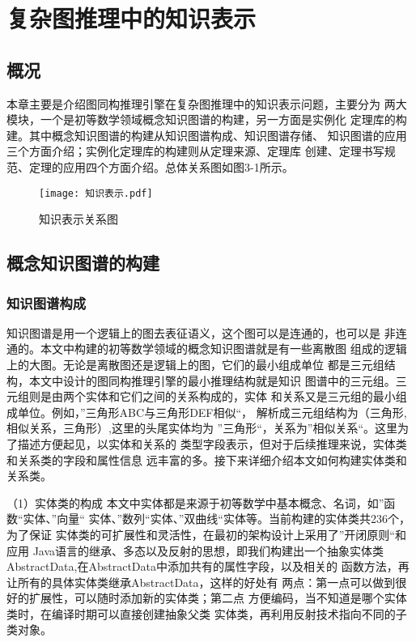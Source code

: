 \documentclass{standalone}
\begin{document}
\chapter{复杂图推理中的知识表示}
\section{概况}
本章主要是介绍图同构推理引擎在复杂图推理中的知识表示问题，主要分为
两大模块，一个是初等数学领域概念知识图谱的构建，另一方面是实例化
定理库的构建。其中概念知识图谱的构建从知识图谱构成、知识图谱存储、
知识图谱的应用三个方面介绍；实例化定理库的构建则从定理来源、定理库
创建、定理书写规范、定理的应用四个方面介绍。总体关系图如图3-1所示。

\begin{figure}[htbp]
	\texttt{[image: 知识表示.pdf]}
	\caption{知识表示关系图}
	\label{知识表示}
\end{figure}
\section{概念知识图谱的构建}
\subsection{知识图谱构成}
知识图谱是用一个逻辑上的图去表征语义，这个图可以是连通的，也可以是
非连通的。本文中构建的初等数学领域的概念知识图谱就是有一些离散图
组成的逻辑上的大图。无论是离散图还是逻辑上的图，它们的最小组成单位
都是三元组结构，本文中设计的图同构推理引擎的最小推理结构就是知识
图谱中的三元组。三元组则是由两个实体和它们之间的关系构成的，实体
和关系又是三元组的最小组成单位。例如，”三角形ABC与三角形DEF相似“，
解析成三元组结构为（三角形,相似关系，三角形）,这里的头尾实体均为
”三角形“，关系为”相似关系“。这里为了描述方便起见，以实体和关系的
类型字段表示，但对于后续推理来说，实体类和关系类的字段和属性信息
远丰富的多。接下来详细介绍本文如何构建实体类和关系类。

（1）实体类的构成
本文中实体都是来源于初等数学中基本概念、名词，如”函数“实体、”向量“
实体、”数列“实体、”双曲线“实体等。当前构建的实体类共236个，为了保证
实体类的可扩展性和灵活性，在最初的架构设计上采用了”开闭原则“和应用
Java语言的继承、多态以及反射的思想，即我们构建出一个抽象实体类
AbstractData,在AbstractData中添加共有的属性字段，以及相关的
函数方法，再让所有的具体实体类继承AbstractData，这样的好处有
两点：第一点可以做到很好的扩展性，可以随时添加新的实体类；第二点
方便编码，当不知道是哪个实体类时，在编译时期可以直接创建抽象父类
实体类，再利用反射技术指向不同的子类对象。
\end{document}
